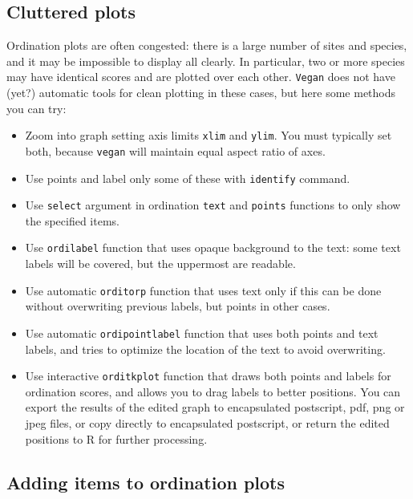 \documentclass[a4paper,10pt]{amsart}
\begin{document}
\subsection{Cluttered plots}

Ordination plots are often congested: there is a large number of sites
and species, and it may be impossible to display all clearly.  In
particular, two or more species may have identical scores and are
plotted over each other.  \texttt{Vegan} does not have (yet?)
automatic tools for clean plotting in these cases, but here some
methods you can try:
\begin{itemize}
\item Zoom into graph setting axis limits \texttt{xlim} and
  \texttt{ylim}.  You must typically set both, because \texttt{vegan}
  will maintain equal aspect ratio of axes.
\item Use points and label only some of these with \texttt{identify}
  command.
\item Use \texttt{select} argument in ordination \texttt{text} and
  \texttt{points} functions to only show the specified items.
\item Use \texttt{ordilabel} function that uses opaque background to
  the text: some text labels will be covered, but the uppermost are
  readable.
\item Use automatic \texttt{orditorp} function that uses text only if
  this can be done without overwriting previous labels, but points in
  other cases.
\item Use automatic \texttt{ordipointlabel} function that uses both
  points and text labels, and tries to optimize the location of the
  text to avoid overwriting.
\item Use interactive \texttt{orditkplot} function that draws both
  points and labels for ordination scores, and allows you to drag labels
  to better positions. You can export the results of the edited graph to
  encapsulated postscript, pdf, png or jpeg files, or copy directly to
  encapsulated postscript, or return the edited positions to R for
  further processing.
\end{itemize}

\subsection{Adding items to ordination plots}
\end{document}
